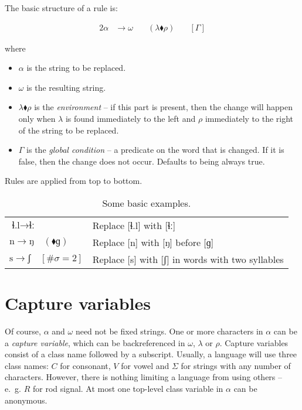 \documentclass{book}
\begin{document}
The basic structure of a rule is:

\begin{alignat}{2}
  \alpha &\rightarrow \omega &\quad(\lambda \blacklozenge \rho) &\quad[\Gamma]
\end{alignat}

where

\begin{itemize}
  \item $\alpha$ is the string to be replaced.
  \item $\omega$ is the resulting string.
  \item $\lambda \blacklozenge \rho$ is the \emph{environment} -- if this part is present, then the change will happen only when $\lambda$ is found immediately to the left and $\rho$ immediately to the right of the string to be replaced.
  \item $\Gamma$ is the \emph{global condition} -- a predicate on the word that is changed. If it is false, then the change does not occur. Defaults to being always true.
\end{itemize}

Rules are applied from top to bottom.

\begin{table}[h]
  \caption{Some basic examples.}
  \centering
  \begin{tabu} to \linewidth {|l|X|}
    \hline
    $\text{ɬ.l} \rightarrow \text{ɬː}$ & Replace [ɬ.l] with [ɬː] \\
    $\text{n} \rightarrow \text{ŋ} \quad(\blacklozenge \text{ɡ})$ & Replace [n] with [ŋ] before [ɡ] \\
    $\text{s} \rightarrow \text{ʃ} \quad[\#\sigma = 2]$ & Replace [s] with [ʃ] in words with two syllables \\
    \hline
  \end{tabu}
\end{table}

\section{Capture variables}

Of course, $\alpha$ and $\omega$ need not be fixed strings. One or more characters in $\alpha$ can be a \emph{capture variable}, which can be backreferenced in $\omega$, $\lambda$ or $\rho$. Capture variables consist of a class name followed by a subscript. Usually, a language will use three class names: $C$ for consonant, $V$ for vowel and $\Sigma$ for strings with any number of characters. However, there is nothing limiting a language from using others -- e.~g. $R$ for rod signal. At most one top-level class variable in $\alpha$ can be anonymous.
\end{document}
